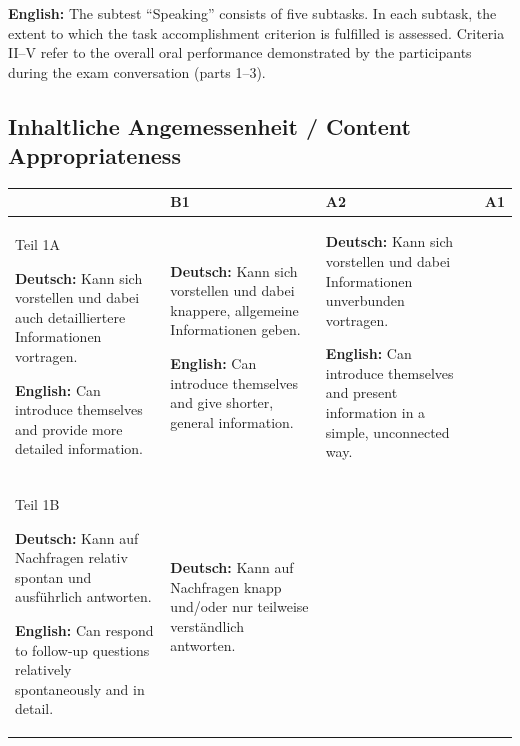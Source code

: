 \documentclass[a4paper]{article}
\begin{document}
            \textbf{English:}
            The subtest “Speaking” consists of five subtasks. In each subtask, the extent to which the task accomplishment criterion is fulfilled is assessed. Criteria II–V refer to the overall oral performance demonstrated by the participants during the exam conversation (parts 1–3).
        
        \subsection{Inhaltliche Angemessenheit / Content Appropriateness}
            
            \begin{table}[H]
                \centering
                \begin{tabular}{|p{3cm}|p{4cm}|p{4cm}|p{4cm}|}
                    \hline
                    & B1 & A2 & A1 \\
                    \hline
                    
                    Teil 1A
                    
                    \textbf{Deutsch:} Kann sich vorstellen und dabei auch detailliertere Informationen vortragen.
                    
                    \textbf{English:} Can introduce themselves and provide more detailed information.
                    &
                    \textbf{Deutsch:} Kann sich vorstellen und dabei knappere, allgemeine Informationen geben.
                    
                    \textbf{English:} Can introduce themselves and give shorter, general information.
                    &
                    \textbf{Deutsch:} Kann sich vorstellen und dabei Informationen unverbunden vortragen.
                    
                    \textbf{English:} Can introduce themselves and present information in a simple, unconnected way.
                    \\
                    \hline
                    
                    Teil 1B
                    
                    \textbf{Deutsch:} Kann auf Nachfragen relativ spontan und ausführlich antworten.
                    
                    \textbf{English:} Can respond to follow-up questions relatively spontaneously and in detail.
                    &
                    \textbf{Deutsch:} Kann auf Nachfragen knapp und/oder nur teilweise verständlich antworten.
                    

\end{tabular}
\end{table}
\end{document}
